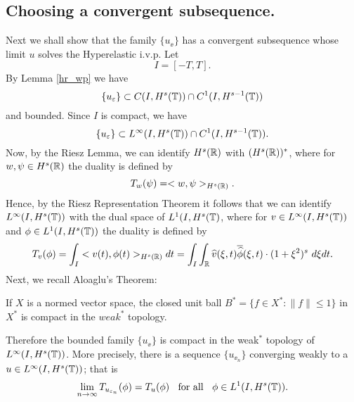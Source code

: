 		\subsection{ Choosing  a convergent subsequence.}
		Next we shall show that  the family $\{ u_\ee\}$ has a convergent subsequence
		whose limit $u$ solves the Hyperelastic i.v.p. 
		Let
		$$
		I= [-T, T].
		$$
		By Lemma \ref{hr_wp} we have 
		\begin{equation}
			\label{C-1-fam}
			\{u_\varepsilon\}\subset C(I, H^s(\mathbb{T}))\cap C^1(I, H^{s-1}(\mathbb{T}))
		\end{equation}
		and bounded. Since $I$ is compact, we have  
		\begin{equation}
			\label{Lip-1-fam}
			\{u_\varepsilon\}\subset L^{\infty}(I, H^s(\mathbb{T}))\cap C^1(I,
			H^{s-1}(\mathbb{T})).
		\end{equation}
		Now, by the Riesz Lemma, we can identify $H^s(\mathbb{R})$ with
		$(H^s(\mathbb{R}))^*$, where for $w, \psi \in H^s(\mathbb{R})$ the duality is
		defined by 
		\begin{equation*}
			T_w(\psi) = <w, \psi>_{H^s(\mathbb{R})}.
		\end{equation*}
		Hence, by the Riesz Representation Theorem it follows that we can
		identify \\ $L^\infty(I, H^s(\mathbb{T})) $ with the dual space of $L^1(I,
		H^{s}(\mathbb{T})$, where for $v\in L^\infty(I, H^s(\mathbb{T})) $ and $ \phi \in
		L^1(I, H^{s}(\mathbb{T}))$ the duality is defined by  
		\begin{equation}
			T_v(\phi) = \int_I <v (t), \phi (t)>_{H^s(\mathbb{R})} dt  = \int_I
			 \int_{\mathbb{R}}
			 \widehat{v}(\xi, t) \overline{\widehat{\phi}}(\xi, t) \cdot (1
			 + \xi^2)^s \ d \xi dt.
		\end{equation}
		Next, we recall Aloaglu's Theorem:
		\begin{theorem}
			If $X$ is a normed vector space,
			the closed unit ball $B^* = \{f \in X^* : \|f\| \le
			1\}$ in $X^*$ is compact in the $weak^*$ topology.
		\end{theorem}
		Therefore the bounded family $\{u_\ee\}$ is compact 
		in the weak$^*$ topology of \\
		$L^\infty(I, H^s(\mathbb{T}))$. More precisely,
		there is a sequence  $\{ u_{\ee_n} \}$ converging
		weakly to a $ u\in L^{\infty}(I, H^s(\mathbb{T}))$;
		that is 
		\begin{equation}
			\label{weak-conv}
			\lim_{n\to \infty} T_{u_{\varepsilon_n}}(\phi)  =  T_u (\phi) 
			\; \;		
			\text{ for all } \;\;  \phi \in L^1(I, H^{s}(\mathbb{T})).
		\end{equation}
